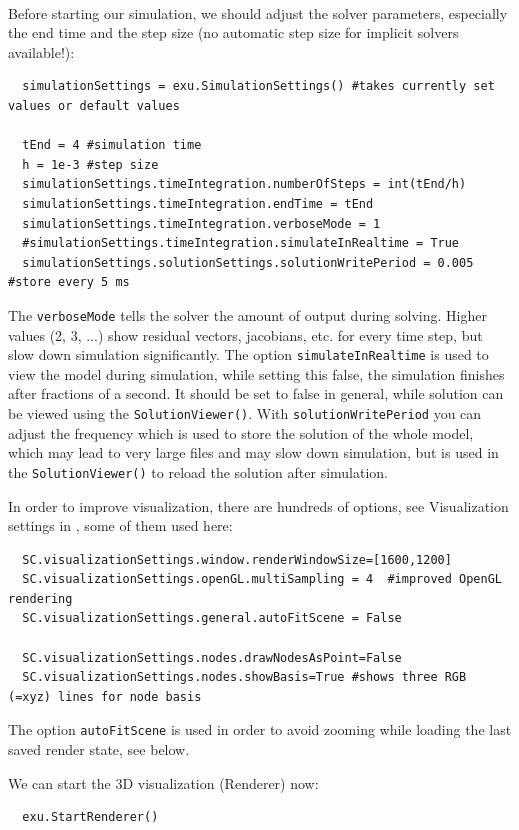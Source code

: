 \horizontalRuler\\
\noindent Before starting our simulation, we should adjust the solver parameters, especially the end time and the step size (no automatic step size for implicit solvers available!):
\pythonstyle\begin{lstlisting}
  simulationSettings = exu.SimulationSettings() #takes currently set values or default values

  tEnd = 4 #simulation time
  h = 1e-3 #step size
  simulationSettings.timeIntegration.numberOfSteps = int(tEnd/h)
  simulationSettings.timeIntegration.endTime = tEnd
  simulationSettings.timeIntegration.verboseMode = 1
  #simulationSettings.timeIntegration.simulateInRealtime = True
  simulationSettings.solutionSettings.solutionWritePeriod = 0.005 #store every 5 ms
\end{lstlisting}
The \texttt{verboseMode} tells the solver the amount of output during solving. Higher values (2, 3, ...) show residual vectors, jacobians, etc. for every time step, but slow down simulation significantly.
The option \texttt{simulateInRealtime} is used to view the model during simulation, while setting this false, the simulation finishes after fractions of a second. It should be set to false in general, while solution can be viewed using the \texttt{SolutionViewer()}.
With \texttt{solutionWritePeriod} you can adjust the frequency which is used to store the solution of the whole model, which may lead to very large files and may slow down simulation, but is used in the \texttt{SolutionViewer()} to reload the solution after simulation.

\noindent In order to improve visualization, there are hundreds of options, see Visualization settings in , some of them used here:
\pythonstyle\begin{lstlisting}
  SC.visualizationSettings.window.renderWindowSize=[1600,1200]
  SC.visualizationSettings.openGL.multiSampling = 4  #improved OpenGL rendering
  SC.visualizationSettings.general.autoFitScene = False

  SC.visualizationSettings.nodes.drawNodesAsPoint=False
  SC.visualizationSettings.nodes.showBasis=True #shows three RGB (=xyz) lines for node basis
\end{lstlisting}
The option \texttt{autoFitScene} is used in order to avoid zooming while loading the last saved render state, see below.

\noindent We can start the 3D visualization (Renderer) now:
\pythonstyle\begin{lstlisting}
  exu.StartRenderer()
\end{lstlisting}

